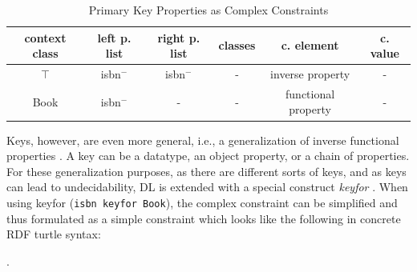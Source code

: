 \documentclass[a4paper,fontsize=11pt]{scrartcl}
\newcommand{\ms}[1]{\texttt{#1}}
\begin{document}
\begin{table}[H]
  \scriptsize
  \sffamily
  \vspace{0cm}
	\caption{Primary Key Properties as Complex Constraints}
	\label{tab:primary-key-properties-as-complex-constraints}
	\centering
		\begin{tabular}{c|c|c|c|c|c}
      \textbf{context class} & \textbf{left p. list} & \textbf{right p. list} & \textbf{classes} & \textbf{c. element} & \textbf{c. value} \\
      \hline
$\top$ & isbn$^{-}$ & isbn$^{-}$ & - & inverse property & - \\
Book & isbn$^{-}$ & - & - & functional property & - \\
		\end{tabular}
\end{table}

Keys, however, are even more general, i.e., a generalization of inverse functional properties \cite{Schneider2009}.
A key can be a datatype, an object property, or a chain of properties.
For these generalization purposes, as there are different sorts of keys, and as keys can lead to undecidability, 
DL is extended with a special construct \emph{keyfor} \cite{Lutz2005}.
When using keyfor (\ms{isbn keyfor Book}), 
the complex constraint can be simplified and thus formulated as a simple constraint which looks like the following in concrete RDF turtle syntax:



\begin{ex} .
\end{ex}
\end{document}
